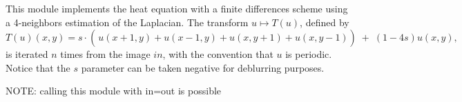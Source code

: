 This module implements the heat equation 
with a finite differences 
scheme using a 4-neighbors estimation of the Laplacian. 
The transform $u\mapsto T(u)$, defined by
$$T(u)(x,y) = 
s \cdot \left( \frac{}{} u(x+1,y)+u(x-1,y)+u(x,y+1)+u(x,y-1) \right)
\; + \; (1-4s) u(x,y),$$
is iterated $n$ times from the image $in$, with the convention
that $u$ is periodic. Notice that the $s$ parameter can be
taken negative for deblurring purposes.

\medskip

NOTE: calling this module with in=out is possible
